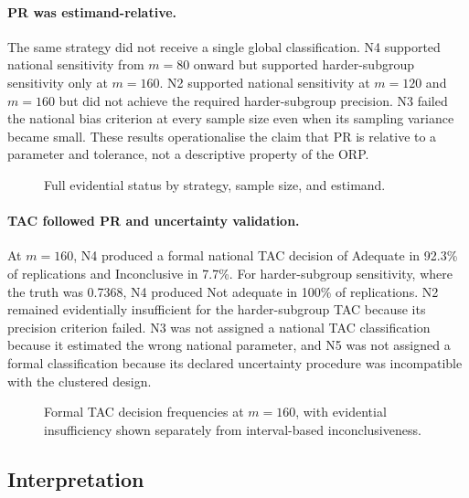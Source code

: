 \paragraph{PR was estimand-relative.}
The same strategy did not receive a single global classification. N4 supported
national sensitivity from \(m=80\) onward but supported harder-subgroup
sensitivity only at \(m=160\). N2 supported national sensitivity at
\(m=120\) and \(m=160\) but did not achieve the required harder-subgroup
precision. N3 failed the national bias criterion at every sample size even
when its sampling variance became small. These results operationalise the
claim that PR is relative to a parameter and tolerance, not a descriptive
property of the ORP.



\begin{figure}[h!]
  \centering
  \caption{Full evidential status by strategy, sample size, and estimand.}
  \label{fig:nav-evidential-status}
\end{figure}

\paragraph{TAC followed PR and uncertainty validation.}
At \(m=160\), N4 produced a formal national TAC decision of Adequate in
92.3\% of replications and Inconclusive in 7.7\%. For harder-subgroup
sensitivity, where the truth was 0.7368, N4 produced Not adequate in 100\% of
replications. N2 remained evidentially insufficient for the harder-subgroup
TAC because its precision criterion failed. N3 was not assigned a national TAC
classification because it estimated the wrong national parameter, and N5 was
not assigned a formal classification because its declared uncertainty
procedure was incompatible with the clustered design.



\begin{figure}[h!]
  \centering
  \caption{Formal TAC decision frequencies at \(m=160\), with evidential insufficiency shown separately from interval-based inconclusiveness.}
  \label{fig:nav-tac}
\end{figure}

\subsection{Interpretation}


